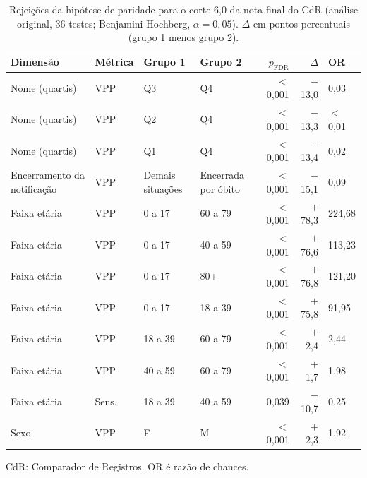\begin{table}[htbp]
\centering
\caption{Rejei\c{c}\~oes da hip\'otese de paridade para o corte 6{,}0 da nota final do CdR (an\'alise original, 36 testes; Benjamini-Hochberg, $\alpha = 0{,}05$). $\Delta$ em pontos percentuais (grupo 1 menos grupo 2).}
\label{tab:qw3-fairness-rejections-corte6}
\footnotesize
\setlength{\tabcolsep}{4pt}
\begin{tabular}{llllrrl}
\toprule
Dimens\~ao & M\'etrica & Grupo 1 & Grupo 2 & $p_{\mathrm{FDR}}$ & $\Delta$ & OR \\
\midrule
Nome (quartis) & VPP & Q3 & Q4 & $<$0{,}001 & $-$13{,}0 & 0{,}03 \\
Nome (quartis) & VPP & Q2 & Q4 & $<$0{,}001 & $-$13{,}3 & $<$0{,}01 \\
Nome (quartis) & VPP & Q1 & Q4 & $<$0{,}001 & $-$13{,}4 & 0{,}02 \\
Encerramento da notifica\c{c}\~ao & VPP & Demais situa\c{c}\~oes & Encerrada por \'obito & $<$0{,}001 & $-$15{,}1 & 0{,}09 \\
Faixa et\'aria  & VPP & 0 a 17 & 60 a 79 & $<$0{,}001 & $+$78{,}3 & 224{,}68 \\
Faixa et\'aria  & VPP & 0 a 17 & 40 a 59 & $<$0{,}001 & $+$76{,}6 & 113{,}23 \\
Faixa et\'aria  & VPP & 0 a 17 & 80+ & $<$0{,}001 & $+$76{,}8 & 121{,}20 \\
Faixa et\'aria  & VPP & 0 a 17 & 18 a 39 & $<$0{,}001 & $+$75{,}8 & 91{,}95 \\
Faixa et\'aria  & VPP & 18 a 39 & 60 a 79 & $<$0{,}001 & $+$2{,}4 & 2{,}44 \\
Faixa et\'aria  & VPP & 40 a 59 & 60 a 79 & $<$0{,}001 & $+$1{,}7 & 1{,}98 \\
Faixa et\'aria  & Sens. & 18 a 39 & 40 a 59 & 0{,}039     & $-$10{,}7 & 0{,}25 \\
Sexo           & VPP & F & M & $<$0{,}001 & $+$2{,}3 & 1{,}92 \\
\bottomrule
\end{tabular}
\par\footnotesize CdR: Comparador de Registros. OR é razão de chances.
\end{table}
